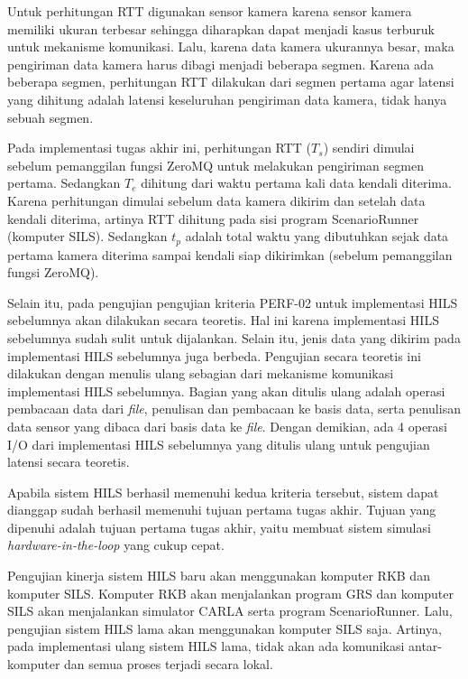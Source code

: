 Untuk perhitungan RTT digunakan sensor kamera karena sensor kamera memiliki
ukuran terbesar sehingga diharapkan dapat menjadi kasus terburuk untuk mekanisme
komunikasi. Lalu, karena data kamera ukurannya besar, maka pengiriman data
kamera harus dibagi menjadi beberapa segmen. Karena ada beberapa segmen,
perhitungan RTT dilakukan dari segmen pertama agar latensi yang dihitung adalah
latensi keseluruhan pengiriman data kamera, tidak hanya sebuah segmen.

Pada implementasi tugas akhir ini, perhitungan RTT ($T_s$) sendiri dimulai
sebelum pemanggilan fungsi ZeroMQ untuk melakukan pengiriman segmen pertama.
Sedangkan $T_e$ dihitung dari waktu pertama kali data kendali diterima. Karena
perhitungan dimulai sebelum data kamera dikirim dan setelah data kendali
diterima, artinya RTT dihitung pada sisi program ScenarioRunner (komputer SILS).
Sedangkan $t_p$ adalah total waktu yang dibutuhkan sejak data pertama kamera diterima
sampai kendali siap dikirimkan (sebelum pemanggilan fungsi ZeroMQ).

Selain itu, pada pengujian pengujian kriteria PERF-02 untuk implementasi HILS
sebelumnya akan dilakukan secara teoretis. Hal ini karena implementasi HILS
sebelumnya sudah sulit untuk dijalankan. Selain itu, jenis data yang dikirim
pada implementasi HILS sebelumnya juga berbeda. Pengujian secara teoretis ini
dilakukan dengan menulis ulang sebagian dari mekanisme komunikasi implementasi
HILS sebelumnya. Bagian yang akan ditulis ulang adalah operasi pembacaan data
dari \textit{file}, penulisan dan pembacaan ke basis data, serta penulisan data
sensor yang dibaca dari basis data ke \textit{file}. Dengan demikian, ada 4
operasi I/O dari implementasi HILS sebelumnya yang ditulis ulang untuk pengujian
latensi secara teoretis.

Apabila sistem HILS berhasil memenuhi kedua kriteria tersebut, sistem dapat
dianggap sudah berhasil memenuhi tujuan pertama tugas akhir. Tujuan yang
dipenuhi adalah tujuan pertama tugas akhir, yaitu membuat sistem simulasi
\textit{hardware-in-the-loop} yang cukup cepat.

Pengujian kinerja sistem HILS baru akan menggunakan komputer RKB dan komputer
SILS. Komputer RKB akan menjalankan program GRS dan komputer SILS akan
menjalankan simulator CARLA serta program ScenarioRunner. Lalu, pengujian sistem
HILS lama akan menggunakan komputer SILS saja. Artinya, pada implementasi ulang
sistem HILS lama, tidak akan ada komunikasi antar-komputer dan semua proses
terjadi secara lokal.


